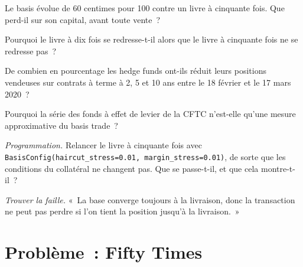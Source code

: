 \begin{exercise}[$\star$]\label{exo:s2:the-bond-futures-basis-trade:3}
Le basis évolue de 60 centimes pour 100 contre un livre à cinquante fois. Que perd-il sur son capital, avant toute vente~?
\end{exercise}

\begin{exercise}[$\star\star$]\label{exo:s2:the-bond-futures-basis-trade:4}
Pourquoi le livre à dix fois se redresse-t-il alors que le livre à cinquante fois ne se redresse pas~?
\end{exercise}

\begin{exercise}[$\star\star$]\label{exo:s2:the-bond-futures-basis-trade:5}
De combien en pourcentage les hedge funds ont-ils réduit leurs positions vendeuses sur contrats à terme à 2, 5 et 10 ans entre le 18 février et le 17 mars 2020~?
\end{exercise}

\begin{exercise}[$\star\star$]\label{exo:s2:the-bond-futures-basis-trade:6}
Pourquoi la série des fonds à effet de levier de la CFTC n'est-elle qu'une mesure approximative du basis trade~?
\end{exercise}

\begin{exercise}[$\star\star\star$]\label{exo:s2:the-bond-futures-basis-trade:7}
\emph{Programmation.} Relancer le livre à cinquante fois avec \texttt{BasisConfig(haircut\_stress=0.01, margin\_stress=0.01)}, de sorte que les conditions du collatéral
ne changent pas. Que se passe-t-il, et que cela montre-t-il~?
\end{exercise}

\begin{exercise}[$\star\star\star$]\label{exo:s2:the-bond-futures-basis-trade:8}
\emph{Trouver la faille.} «~La base converge toujours à la livraison, donc la transaction ne peut pas perdre si l'on tient la position jusqu'à la livraison.~»
\end{exercise}

\section{Problème~: Fifty Times}

